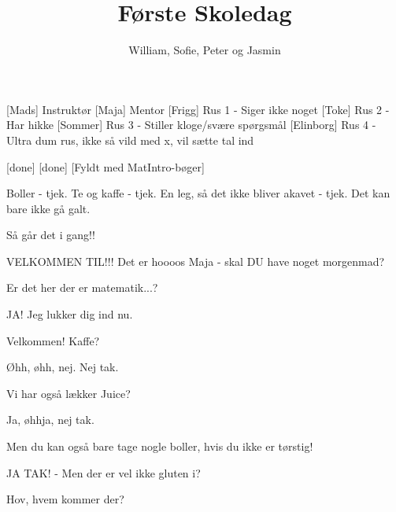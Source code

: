 \documentclass[a4paper,11pt]{article}
\title{Første Skoledag}
\author{William, Sofie, Peter og Jasmin}
\begin{document}
\maketitle

\begin{roles}
[Mads] Instruktør
[Maja] Mentor
[Frigg] Rus 1 - Siger ikke noget
[Toke] Rus 2 - Har hikke
[Sommer] Rus 3 - Stiller kloge/svære spørgsmål
[Elinborg] Rus 4 - Ultra dum rus, ikke så vild med x, vil sætte tal ind
\end{roles}

\begin{props}
[done]
[done]
[Fyldt med MatIntro-bøger]
\end{props}
  
\begin{sketch}

 Boller - tjek. Te og kaffe - tjek. En leg, så det ikke bliver akavet - tjek. Det kan bare ikke gå galt.


 Så går det i gang!!

 VELKOMMEN TIL!!! Det er hoooos Maja - skal DU have noget morgenmad?


 Er det her der er matematik...?

 JA! Jeg lukker dig ind nu.


 Velkommen! Kaffe?


 Øhh, øhh, nej. Nej tak.

 Vi har også lækker Juice?

 Ja, øhhja, nej tak.

 Men du kan også bare tage nogle boller, hvis du ikke er tørstig!

 JA TAK! - Men der er vel ikke gluten i? 


 Hov, hvem kommer der?


\end{sketch}
\end{document}
